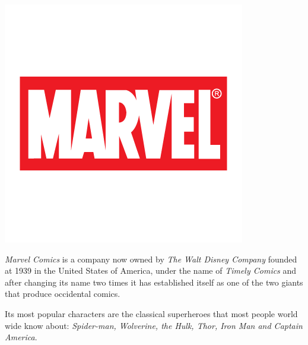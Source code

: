 \noindent\begin{minipage}{0.3\textwidth}%
\includegraphics[width=\linewidth]{img/marvel_logo.png}
\end{minipage}%
\begin{minipage}{0.02\textwidth}%
\hfill%

\end{minipage}
\begin{minipage}{0.68\textwidth}%

\textit{Marvel Comics} is a company now owned by \textit{The Walt Disney Company} founded at 1939 in the United States of America, under the name of \textit{Timely Comics} and after changing its name two times it has established itself as one of the two giants that produce occidental comics.


Its most popular characters are the classical superheroes that most people world wide know about: \textit{Spider-man, Wolverine, the Hulk, Thor, Iron Man and Captain America}.
\end{minipage}


